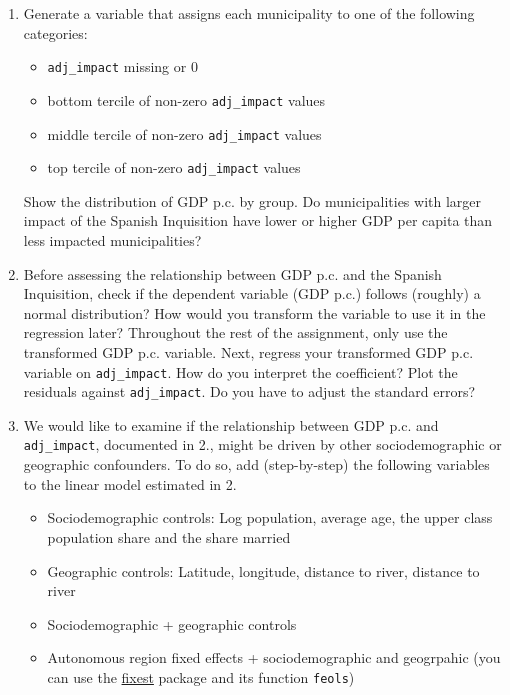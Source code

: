 \documentclass[
]{report}
\providecommand{\tightlist}{%
  \setlength{\itemsep}{0pt}\setlength{\parskip}{0pt}}\usepackage{longtable,booktabs,array}
\begin{document}
\begin{enumerate}
\def\labelenumi{\arabic{enumi}.}
\item
  Generate a variable that assigns each municipality to one of the
  following categories:

  \begin{itemize}
  \tightlist
  \item
    \texttt{adj\_impact} missing or 0
  \item
    bottom tercile of non-zero \texttt{adj\_impact} values
  \item
    middle tercile of non-zero \texttt{adj\_impact} values
  \item
    top tercile of non-zero \texttt{adj\_impact} values
  \end{itemize}

  Show the distribution of GDP p.c. by group. Do municipalities with
  larger impact of the Spanish Inquisition have lower or higher GDP per
  capita than less impacted municipalities?
\item
  Before assessing the relationship between GDP p.c. and the Spanish
  Inquisition, check if the dependent variable (GDP p.c.) follows
  (roughly) a normal distribution? How would you transform the variable
  to use it in the regression later? Throughout the rest of the
  assignment, only use the transformed GDP p.c. variable. Next, regress
  your transformed GDP p.c. variable on \texttt{adj\_impact}. How do you
  interpret the coefficient? Plot the residuals against
  \texttt{adj\_impact}. Do you have to adjust the standard errors?
\item
  We would like to examine if the relationship between GDP p.c. and
  \texttt{adj\_impact}, documented in 2., might be driven by other
  sociodemographic or geographic confounders. To do so, add
  (step-by-step) the following variables to the linear model estimated
  in 2.

  \begin{itemize}
  \tightlist
  \item
    Sociodemographic controls: Log population, average age, the upper
    class population share and the share married
  \item
    Geographic controls: Latitude, longitude, distance to river,
    distance to river
  \item
    Sociodemographic + geographic controls
  \item
    Autonomous region fixed effects + sociodemographic and geogrpahic
    (you can use the \href{https://lrberge.github.io/fixest/}{fixest}
    package and its function \texttt{feols})
  \end{itemize}
\end{enumerate}
\end{document}
